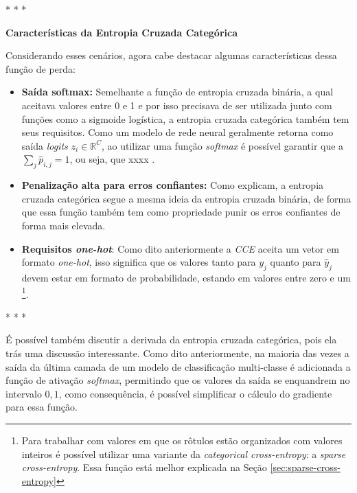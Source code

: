 \medskip
\begin{center}
 * * *
\end{center}
\medskip

\textbf{Características da Entropia Cruzada Categórica}
\vspace{1em}

Considerando esses cenários, agora cabe destacar algumas características dessa função de perda:

\begin{itemize}
    \item \textbf{Saída softmax:} Semelhante a função de entropia cruzada binária, a qual aceitava valores entre 0 e 1 e por isso precisava de ser utilizada junto com funções como a sigmoide logística, a entropia cruzada categórica também tem seus requisitos. Como um modelo de rede neural geralmente retorna como saída \textit{logits} $z_i \in \mathbb{R}^C$, ao utilizar uma função \textit{softmax} é possível garantir que a $\sum_{j} \hat{p}_{i,j} = 1$, ou seja, que xxxx \parencite{LossesArticle}.
    \item \textbf{Penalização alta para erros confiantes:} Como \textcite{LossesArticle} explicam, a entropia cruzada categórica segue a mesma ideia da entropia cruzada binária, de forma que essa função também tem como propriedade punir os erros confiantes de forma mais elevada.
    \item \textbf{Requisitos \textit{one-hot}}: Como dito anteriormente a \textit{CCE} aceita um vetor em formato \textit{one-hot}, isso significa que os valores tanto para $y_j$ quanto para $\hat{y}_j$ devem estar em formato de probabilidade, estando em valores entre zero e um \footnote{Para trabalhar com valores em que os rôtulos estão organizados com valores inteiros é possível utilizar uma variante da \textit{categorical cross-entropy}: a \textit{sparse cross-entropy}. Essa função está melhor explicada na Seção \ref{sec:sparse-cross-entropy}}.
\end{itemize}

\medskip
\begin{center}
 * * *
\end{center}
\medskip

É possível também discutir a derivada da entropia cruzada categórica, pois ela trás uma discussão interessante. Como dito anteriormente, na maioria das vezes a saída da última camada de um modelo de classificação multi-classe é adicionada a função de ativação \textit{softmax}, permitindo que os valores da saída se enquandrem no intervalo ${0, 1}$, como consequência, é possível simplificar o cálculo do gradiente para essa função. 

